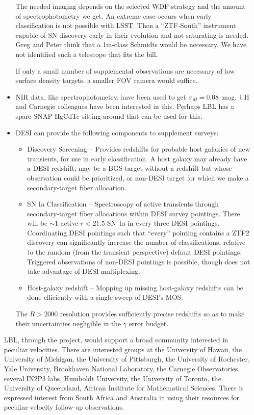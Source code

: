 \begin{itemize}
The needed imaging depends on the selected WDF strategy and the amount of spectrophotometry
we get.  An extreme case occurs when early classification is not possible with LSST.  Then a
``ZTF-South'' instrument capable of SN discovery early in their evolution and not saturating is needed.
Greg and Peter think that a 1m-class Schmidts would be necessary.  We have not identified such a telescope
that fits the bill.

If only a small number of supplemental observations are necessary of low surface density targets, a smaller FOV camera would suffice.

\item NIR data, like spectrophotometry, have been used to get $\sigma_M=0.08$~mag. UH and Carnegie colleagues have been interested
in this.  Perhaps LBL has a spare SNAP HgCdTe sitting around that can be used for this.
\item DESI can provide the following components to supplement surveys:
\begin{itemize}
\item Discovery Screening -- Provides redshifts for probable host galaxies of new transients, for use in early classification.  A host galaxy may
already have a DESI redshift, may be a BGS target without a redshift but whose observation could be prioritized,  or non-DESI target for which we
make a secondary-target fiber allocation.
\item SN Ia Classification -- Spectroscopy of active transients  through secondary-target fiber allocations within
DESI survey pointings. There
will be $\sim 1$ active $r<21.5$ SN~Ia in every three DESI pointings.  Coordinating DESI pointings such that ``every'' pointing contains
a  ZTF2 discovery can significantly increase the number of classifications, relative to the random (from the transient perspective) default DESI pointings.
Triggered observations of non-DESI pointings is possible, though does not take advantage of DESI multiplexing.
\item Host-galaxy redshift -- Mopping up missing host-galaxy redshifts
can be done efficiently with a single sweep of DESI's MOS.
\end{itemize}
 The $R>2000$ resolution
provides sufficiently precise redshifts so as to make their uncertainties negligible in the $\gamma$ error budget.

\end{itemize}

LBL, through the project, would support a broad community interested in peculiar velocities. 
There are interested groups at the  University of Hawaii, the University of Michigan, the University of Pittsburgh, the University of Rochester, Yale University,  Brookhaven National Laboratory,
the Carnegie Observatories, several IN2P3 labs, Humboldt University, the University of Toronto,  the University of Queensland, African Institute for Mathematical
Sciences.
There is expressed interest from South Africa and Australia in using their resources for peculiar-velocity follow-up observations.

